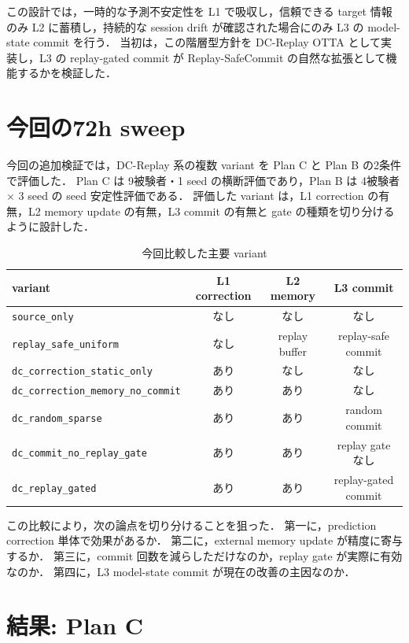 \documentclass[a4paper,11pt]{ltjsarticle}
\newcommand{\source}{\texttt{source\_only}}
\newcommand{\replay}{\texttt{replay\_safe\_uniform}}
\begin{document}
この設計では，一時的な予測不安定性を L1 で吸収し，信頼できる target 情報のみ L2 に蓄積し，持続的な session drift が確認された場合にのみ L3 の model-state commit を行う．
当初は，この階層型方針を DC-Replay OTTA として実装し，L3 の replay-gated commit が Replay-SafeCommit の自然な拡張として機能するかを検証した．

\section{今回の72h sweep}

今回の追加検証では，DC-Replay 系の複数 variant を Plan C と Plan B の2条件で評価した．
Plan C は 9被験者・1 seed の横断評価であり，Plan B は 4被験者 \(\times\) 3 seed の seed 安定性評価である．
評価した variant は，L1 correction の有無，L2 memory update の有無，L3 commit の有無と gate の種類を切り分けるように設計した．

\begin{table}[h]
  \centering
  \caption{今回比較した主要 variant}
  \label{tab:variants}
  \begin{tabular}{lccc}
    \toprule
    variant & L1 correction & L2 memory & L3 commit \\
    \midrule
    \source & なし & なし & なし \\
    \replay & なし & replay buffer & replay-safe commit \\
    \texttt{dc\_correction\_static\_only} & あり & なし & なし \\
    \texttt{dc\_correction\_memory\_no\_commit} & あり & あり & なし \\
    \texttt{dc\_random\_sparse} & あり & あり & random commit \\
    \texttt{dc\_commit\_no\_replay\_gate} & あり & あり & replay gate なし \\
    \texttt{dc\_replay\_gated} & あり & あり & replay-gated commit \\
    \bottomrule
  \end{tabular}
\end{table}

この比較により，次の論点を切り分けることを狙った．
第一に，prediction correction 単体で効果があるか．
第二に，external memory update が精度に寄与するか．
第三に，commit 回数を減らしただけなのか，replay gate が実際に有効なのか．
第四に，L3 model-state commit が現在の改善の主因なのか．

\section{結果: Plan C}
\end{document}
